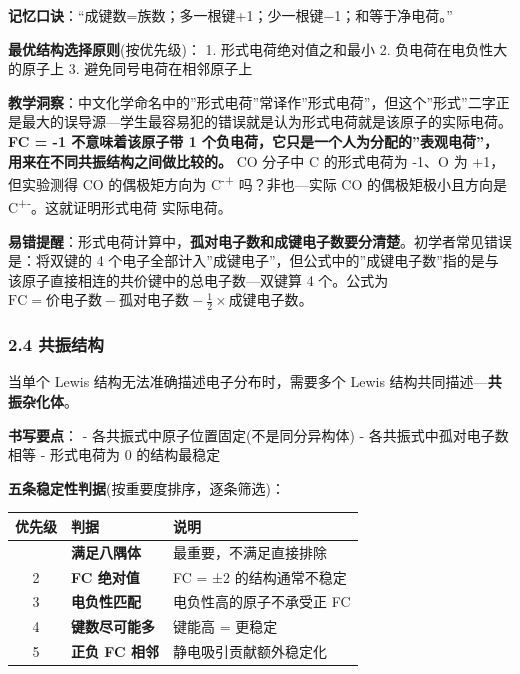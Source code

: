 \textbf{记忆口诀}：``成键数=族数；多一根键+1；少一根键−1；和等于净电荷。''

\textbf{最优结构选择原则}(按优先级)：
1. 形式电荷绝对值之和最小
2. 负电荷在电负性大的原子上
3. 避免同号电荷在相邻原子上

\textbf{教学洞察}：中文化学命名中的''形式电荷''常译作''形式电荷''，但这个''形式''二字正是最大的误导源---学生最容易犯的错误就是认为形式电荷就是该原子的实际电荷。\textbf{FC = -1 不意味着该原子带 1 个负电荷，它只是一个人为分配的''表观电荷''，用来在不同共振结构之间做比较的。} CO 分子中 C 的形式电荷为 -1、O 为 +1，但实验测得 CO 的偶极矩方向为 C\textsuperscript{-}\textsuperscript{+} 吗？非也---实际 CO 的偶极矩极小且方向是 C\textsuperscript{+}\textsuperscript{-}。这就证明形式电荷  实际电荷。

\textbf{易错提醒}：形式电荷计算中，\textbf{孤对电子数和成键电子数要分清楚}。初学者常见错误是：将双键的 4 个电子全部计入''成键电子''，但公式中的''成键电子数''指的是与该原子直接相连的共价键中的总电子数---双键算 4 个。公式为 \(\text{FC} = \text{价电子数} - \text{孤对电子数} - \frac{1}{2} \times \text{成键电子数}\)。

\subsubsection{2.4 共振结构}\label{ux5171ux632fux7ed3ux6784}

当单个 Lewis 结构无法准确描述电子分布时，需要多个 Lewis 结构共同描述---\textbf{共振杂化体}。

\textbf{书写要点}：
- 各共振式中原子位置固定(不是同分异构体)
- 各共振式中孤对电子数相等
- 形式电荷为 0 的结构最稳定

\textbf{五条稳定性判据}(按重要度排序，逐条筛选)：

{\def\LTcaptype{none} %
\begin{longtable}[]{@{}cll@{}}
\toprule\noalign{}
优先级 & 判据 & 说明 \\
\midrule\noalign{}
\endhead
\bottomrule\noalign{}
\endlastfoot
1 & \textbf{满足八隅体} & 最重要，不满足直接排除 \\
2 & \textbf{FC 绝对值  1} & FC = ±2 的结构通常不稳定 \\
3 & \textbf{电负性匹配} & 电负性高的原子不承受正 FC \\
4 & \textbf{键数尽可能多} & 键能高 = 更稳定 \\
5 & \textbf{正负 FC 相邻} & 静电吸引贡献额外稳定化 \\
\end{longtable}
}

